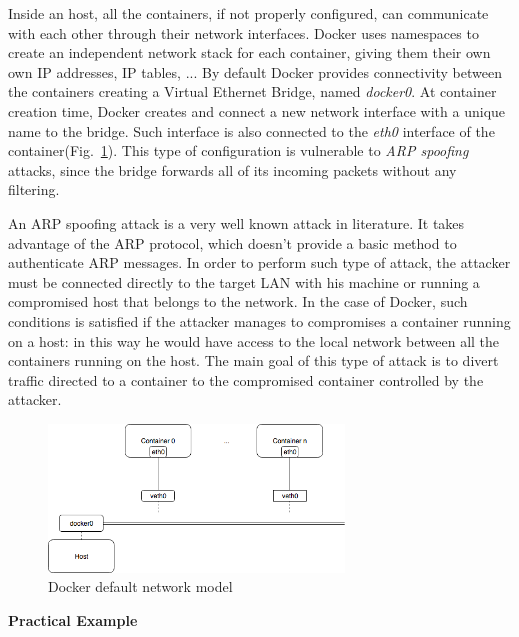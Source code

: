 \documentclass[a4paper,12pt]{article}
\def\myfig#1{Fig.~#1\xspace}
\begin{document}
Inside an host, all the containers, if not properly configured, can communicate
with each other through their network interfaces. Docker uses namespaces to
create an independent network stack for each container, giving them their own
own IP addresses, IP tables, ... By default Docker provides connectivity
between the containers creating a Virtual Ethernet Bridge, named
\textit{docker0}. At container creation time, Docker creates and connect a new
network interface with a unique name to the bridge. Such interface is also
connected to the \textit{eth0} interface of the
container(\myfig{\ref{fig:docker_network_model}}). This type of configuration is
vulnerable to \textit{ARP spoofing} attacks, since the bridge forwards all of
its incoming packets without any filtering. \par An ARP spoofing attack is a
very well known attack in literature. It takes advantage of the ARP protocol,
which doesn't provide a basic method to authenticate ARP messages. In order to
perform such type of attack, the attacker must be connected directly to the
target LAN with his machine or running a compromised host that belongs to the
network. In the case of Docker, such conditions is satisfied if the attacker
manages to compromises a container running on a host: in this way he would have
access to the local network between all the containers running on the host. The
main goal of this type of attack is to divert traffic directed to a container to
the compromised container controlled by the attacker.   
\begin{figure}[ht!]
  \centerline{\includegraphics[width=0.7\textwidth]{docker-network-model.png}}
  \caption{Docker default network model}
  \label{fig:docker_network_model}
  \end{figure}

\bigbreak\textbf{Practical Example}\bigbreak 
\end{document}
